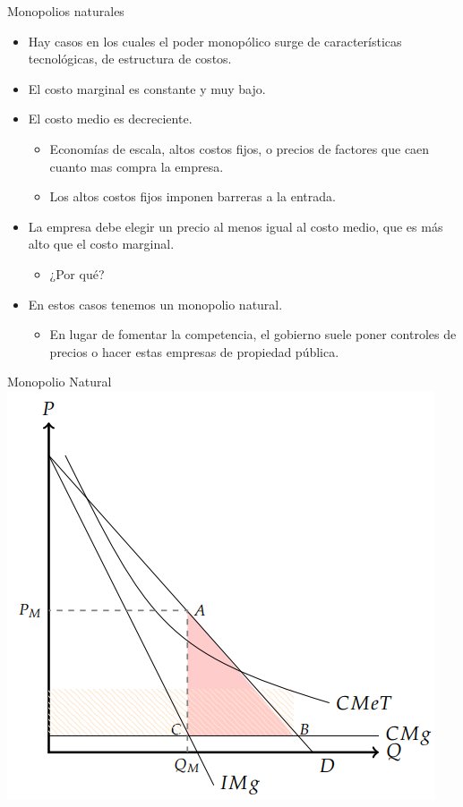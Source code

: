 \documentclass{beamer}
\begin{document}
\begin{frame}{Monopolios naturales}
    \begin{itemize}
        \item Hay casos en los cuales el poder monopólico surge de características tecnológicas, de estructura de costos.
        \item El costo marginal es constante y muy bajo.
        \item El costo medio es decreciente. 
        \begin{itemize}
            \item Economías de escala, altos costos fijos, o precios de factores que caen cuanto mas compra la empresa.
            \item Los altos costos fijos imponen barreras a la entrada.
        \end{itemize}
        \item La empresa debe elegir un precio al menos igual al costo medio, que es más alto que el costo marginal.
        \begin{itemize}
            \item ¿Por qué?
        \end{itemize}
        \item En estos casos tenemos un monopolio natural.
        \begin{itemize}
            \item En lugar de fomentar la competencia, el gobierno suele poner controles de precios o hacer estas empresas de propiedad pública.
        \end{itemize}
    \end{itemize}
\end{frame}

\begin{frame}{Monopolio Natural}
    \centering
    \includegraphics[scale=0.75]{../Figures/C22.10.png}
\end{frame}
\end{document}
